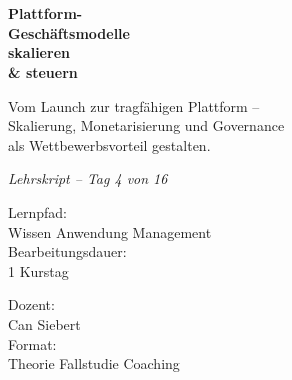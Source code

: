 \documentclass[11pt,a4paper,oneside]{article}
\newcommand{\caveatfontfallback}{\itshape}
\newcommand\caveatfont{\caveatfontfallback}%
\begin{document}
\begin{titlepage}
  \pagestyle{empty}
  \vspace*{1.5cm}
  \\[2pt]
  \noindent{\color{lpAccent}\rule{\linewidth}{1.2pt}}\\[4pt]

  \vspace{3cm}
  {\sffamily\fontsize{30}{34}\selectfont\bfseries\color{lpInk}Plattform-\\Geschäftsmodelle\\skalieren\\\& steuern\par}

  \vspace{0.7cm}
  {\sffamily\large\color{lpGray}Vom Launch zur tragfähigen Plattform --\\Skalierung, Monetarisierung und Governance\\als Wettbewerbsvorteil gestalten.\par}

  \vspace{1.5cm}
  {\caveatfont\LARGE\color{lpAmber}Lehrskript -- Tag 4 von 16}\par

  \vfill

  \noindent\begin{minipage}{0.55\linewidth}
    {\sffamily\footnotesize\color{lpGray}Lernpfad:}\\
    {\sffamily\small\color{lpInk}Wissen \textrightarrow{} Anwendung \textrightarrow{} Management}\\[10pt]
    {\sffamily\footnotesize\color{lpGray}Bearbeitungsdauer:}\\
    {\sffamily\small\color{lpInk}1 Kurstag}
  \end{minipage}\hfill
  \begin{minipage}{0.4\linewidth}
    \raggedleft
    {\sffamily\footnotesize\color{lpGray}Dozent:}\\
    {\sffamily\small\color{lpInk}Can Siebert}\\[10pt]
    {\sffamily\footnotesize\color{lpGray}Format:}\\
    {\sffamily\small\color{lpInk}Theorie \textperiodcentered{} Fallstudie \textperiodcentered{} Coaching}
  \end{minipage}

  \vspace{0.5cm}
  \noindent{\color{lpAccent}\rule{\linewidth}{0.6pt}}
\end{titlepage}
\end{document}
